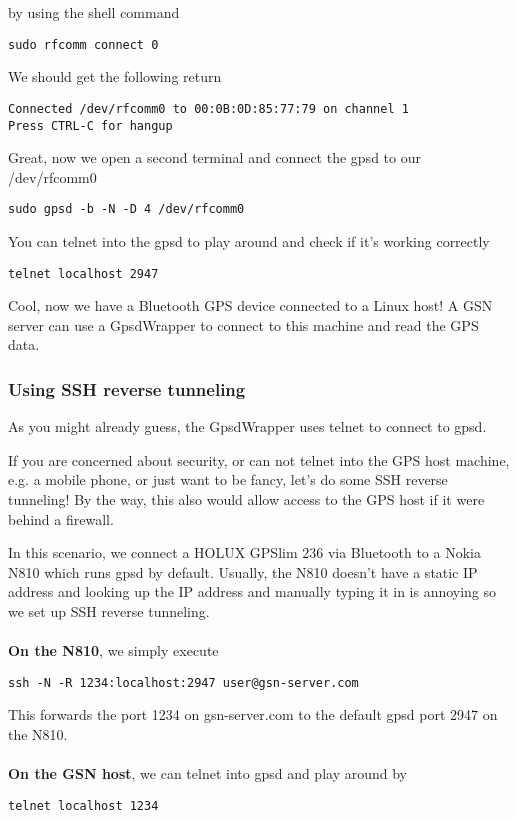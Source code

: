 by using the shell command
\begin{verbatim}
sudo rfcomm connect 0
\end{verbatim}
We should get the following return
\begin{verbatim}
Connected /dev/rfcomm0 to 00:0B:0D:85:77:79 on channel 1
Press CTRL-C for hangup
\end{verbatim}
Great, now we open a second terminal and connect the gpsd to our /dev/rfcomm0
\begin{verbatim}
sudo gpsd -b -N -D 4 /dev/rfcomm0
\end{verbatim}
You can telnet into the gpsd to play around and check if it's working correctly
\begin{verbatim}
telnet localhost 2947
\end{verbatim}
Cool, now we have a Bluetooth GPS device connected to a Linux host! A GSN server can use a GpsdWrapper to connect to this machine and read the GPS data.

\subsubsection{Using SSH reverse tunneling}
As you might already guess, the GpsdWrapper uses telnet to connect to gpsd. 

If you are concerned about security, or can not telnet into the GPS host machine, e.g. a mobile phone, or just want to be fancy, let's do some SSH reverse tunneling! By the way, this also would allow access to the GPS host if it were behind a firewall.

In this scenario, we connect a HOLUX GPSlim 236 via Bluetooth to a Nokia N810 which runs gpsd by default. Usually, the N810 doesn't have a static IP address and looking up the IP address and manually typing it in is annoying so we set up SSH reverse tunneling.\\
\\
\textbf{On the N810}, we simply execute 
\begin{verbatim}
ssh -N -R 1234:localhost:2947 user@gsn-server.com
\end{verbatim}
This forwards the port 1234 on gsn-server.com to the default gpsd port 2947 on the N810.\\
\\
\textbf{On the GSN host}, we can telnet into gpsd and play around by
\begin{verbatim}
telnet localhost 1234
\end{verbatim}


